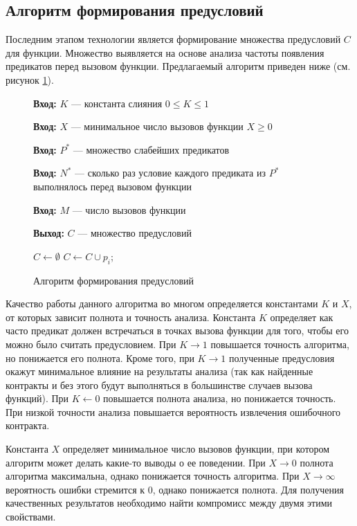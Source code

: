 \subsection{Алгоритм формирования предусловий}
Последним этапом технологии является формирование множества предусловий $C$ для функции. Множество выявляется на основе анализа частоты появления предикатов перед вызовом функции. Предлагаемый
алгоритм приведен ниже (см. рисунок \ref{image:extractionAlgoritm}).
\begin{figure}[h!]
\textbf{Вход:} $K$ --- константа слияния $0 \le K \le 1$

\textbf{Вход:} $X$ --- минимальное число вызовов функции $X \ge 0$

\textbf{Вход:} $P^*$ --- множество слабейших предикатов

\textbf{Вход:} $N^*$ --- сколько раз условие каждого предиката из $P^*$ выполнялось перед вызовом функции

\textbf{Вход:} $M$ --- число вызовов функции

\textbf{Выход:} $C$ --- множество предусловий
\begin{algorithmic}[1]
\State $C \leftarrow \emptyset$
	\State \Return
\EndIf
{}
	\State $C \gets C \cup p_i$;
    \EndIf
\EndFor
\end{algorithmic}
\caption{Алгоритм формирования предусловий}
\label{image:extractionAlgoritm}
\end{figure}

Качество работы данного алгоритма во многом определяется константами $K$ и $X$, от которых зависит полнота и точность анализа. Константа $K$ определяет как часто предикат должен встречаться в точках вызова функции для того, чтобы его можно было считать предусловием. При $K \to 1$ повышается точность алгоритма, но понижается его полнота. Кроме того, при $K \to 1$ полученные предусловия окажут минимальное влияние на результаты анализа (так как найденные контракты и без этого будут выполняться в большинстве случаев вызова функций). При $K \leftarrow 0$ повышается полнота анализа, но понижается точность. При низкой точности анализа повышается вероятность извлечения ошибочного контракта. 

Константа $X$ определяет минимальное число вызовов функции, при котором алгоритм может делать какие-то выводы о ее поведении. При $X \to 0$ полнота алгоритма максимальна, однако  понижается точность алгоритма. При $X \to \infty$ вероятность ошибки стремится к 0, однако понижается полнота. Для получения качественных результатов необходимо найти компромисс между двумя этими свойствами.

